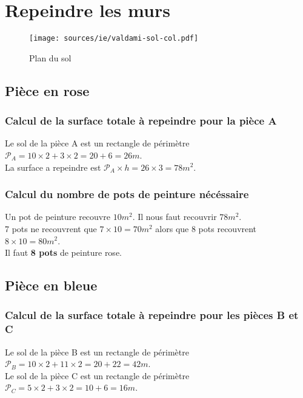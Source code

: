 \documentclass[11pt]{article}
\begin{document}

\section{Repeindre les murs}

\begin{figure}[H]
  \centering
  \texttt{[image: sources/ie/valdami-sol-col.pdf]}
  \caption{Plan du sol}
  \label{fig:ch1-plan}
\end{figure}


\subsection{Pièce en rose}
\subsubsection{Calcul de la surface totale à repeindre pour la pièce A}
Le sol de la pièce A est un rectangle de périmètre $ \mathcal{P}_{A} = 10 \times 2 + 3 \times 2 = 20 + 6 = 26m$.\\
La surface a repeindre est $\mathcal{P}_{A} \times h = 26 \times 3 = 78m^2$.\\

\subsubsection{Calcul du nombre de pots de peinture nécéssaire}
Un pot de peinture recouvre $10m^2$. Il nous faut recouvrir $78m^2$.\\
7 pots ne recouvrent que $7 \times 10 = 70m^2$ alors que 8 pots recouvrent $8 \times 10 = 80m^2$.\\
Il faut \textbf{8 pots} de peinture rose.  

\subsection{Pièce en bleue}
\subsubsection{Calcul de la surface totale à repeindre pour les pièces B et C}
Le sol de la pièce B est un rectangle de périmètre $ \mathcal{P}_{B} = 10 \times 2 + 11 \times 2 = 20 + 22 = 42m$.\\
Le sol de la pièce C est un rectangle de périmètre $ \mathcal{P}_{C} = 5 \times 2 + 3 \times 2 = 10 + 6 = 16m$.\\  
\end{document}
